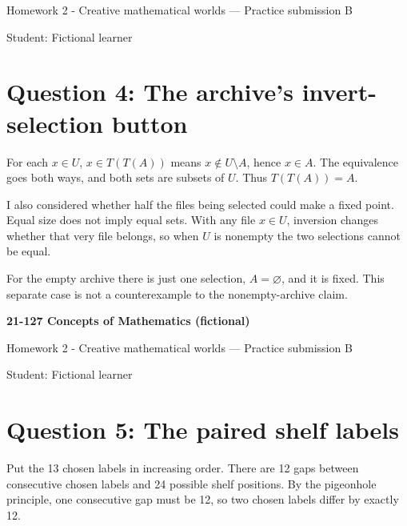 \documentclass[11pt]{article}
\begin{document}
Homework 2 - Creative mathematical worlds --- Practice submission B

Student: Fictional learner

\section*{Question 4: The archive's invert-selection button}

For each $x\in U$, $x\in T(T(A))$ means $x\notin U\setminus A$, hence $x\in A$. The equivalence goes both ways, and both sets are subsets of $U$. Thus $T(T(A))=A$.

I also considered whether half the files being selected could make a fixed point. Equal size does not imply equal sets. With any file $x\in U$, inversion changes whether that very file belongs, so when $U$ is nonempty the two selections cannot be equal.

For the empty archive there is just one selection, $A=\varnothing$, and it is fixed. This separate case is not a counterexample to the nonempty-archive claim.

\newpage
\textbf{21-127 Concepts of Mathematics (fictional)}

Homework 2 - Creative mathematical worlds --- Practice submission B

Student: Fictional learner

\section*{Question 5: The paired shelf labels}

Put the 13 chosen labels in increasing order. There are 12 gaps between consecutive chosen labels and 24 possible shelf positions. By the pigeonhole principle, one consecutive gap must be 12, so two chosen labels differ by exactly 12.
\end{document}
